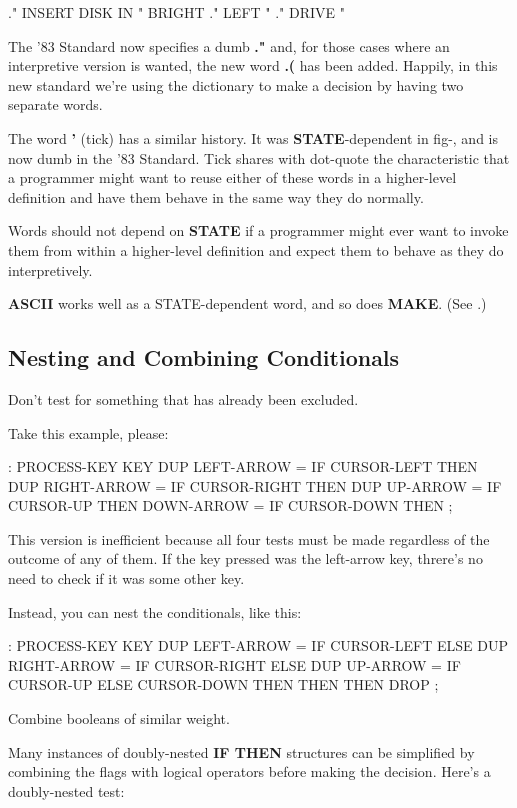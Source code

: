 \begin{Code}
." INSERT DISK IN "  BRIGHT ." LEFT "  ." DRIVE "
\end{Code}
The '83 Standard now specifies a dumb \textbf{."} and, for those cases where an
interpretive version is wanted, the new word \textbf{.(} has been added. Happily,
in this new standard we're using the dictionary to make a decision by
having two separate words.

The word \textbf{'} (tick) has a similar history. It was \textbf{STATE}-dependent in
fig-\Forth{}, and is now dumb in the '83 Standard. Tick shares with
dot-quote the characteristic that a programmer might want to reuse either of
these words in a higher-level definition and have them behave in the same
way they do normally.

\begin{tip}
Words should not depend on \textbf{STATE} if a programmer might ever want to
invoke them from within a higher-level definition and expect them to
behave as they do interpretively.
\end{tip}
\textbf{ASCII} works well as a STATE-dependent word, and so does \textbf{MAKE}.
(See .)

\subsection{Nesting and Combining Conditionals}
\begin{tip}
Don't test for something that has already been excluded.
\end{tip}
Take this example, please:

\begin{Code}
: PROCESS-KEY
   KEY  DUP  LEFT-ARROW  =  IF CURSOR-LEFT  THEN
        DUP  RIGHT-ARROW =  IF CURSOR-RIGHT THEN
        DUP  UP-ARROW    =  IF CURSOR-UP    THEN
             DOWN-ARROW  =  IF CURSOR-DOWN  THEN ;
\end{Code}
This version is inefficient because all four tests must be made regardless
of the outcome of any of them. If the key pressed was the left-arrow key,
threre's no need to check if it was some other key.

Instead, you can nest the conditionals, like this:

\begin{Code}
: PROCESS-KEY
   KEY  DUP  LEFT-ARROW  =  IF CURSOR-LEFT  ELSE
        DUP  RIGHT-ARROW =  IF CURSOR-RIGHT ELSE
        DUP  UP-ARROW    =  IF CURSOR-UP    ELSE
                               CURSOR-DOWN
           THEN THEN THEN  DROP ;
\end{Code}
\begin{tip}
Combine booleans of similar weight.
\end{tip}
Many instances of doubly-nested \textbf{IF THEN} structures can be simplified
by combining the flags with logical operators before making the decision.
Here's a doubly-nested test:

